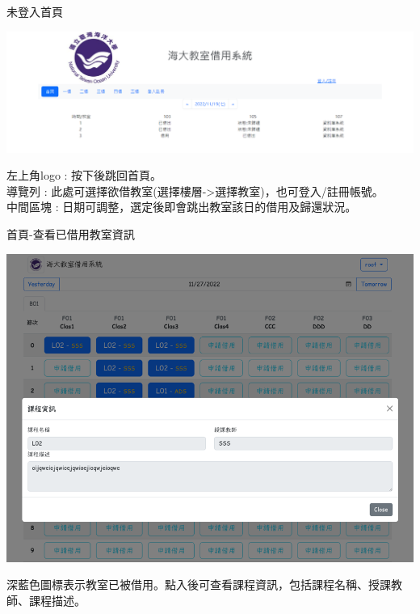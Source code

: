 \documentclass{article}
\begin{document}
	\begin{Large}
		未登入首頁
	\end{Large}
	\bigskip
	\begin{center}
		\includegraphics[scale=0.35]{SDDFirstpage.png}
	\end{center}
		左上角logo : 按下後跳回首頁。
		\bigskip
	 \\ 導覽列     : 此處可選擇欲借教室(選擇樓層->選擇教室)，也可登入/註冊帳號。
	 	\bigskip
	 \\ 中間區塊   : 日期可調整，選定後即會跳出教室該日的借用及歸還狀況。
	
	\bigskip
	\bigskip
	\bigskip
	\bigskip
	\bigskip

	\begin{Large}
		首頁-查看已借用教室資訊
	\end{Large}
	\bigskip
	\begin{center}
		\includegraphics[scale=0.45]{SDDFirstpageclassroominfo.png}
	\end{center}
		深藍色圖標表示教室已被借用。點入後可查看課程資訊，包括課程名稱、授課教師、課程描述。
	
	\newpage
\end{document}
